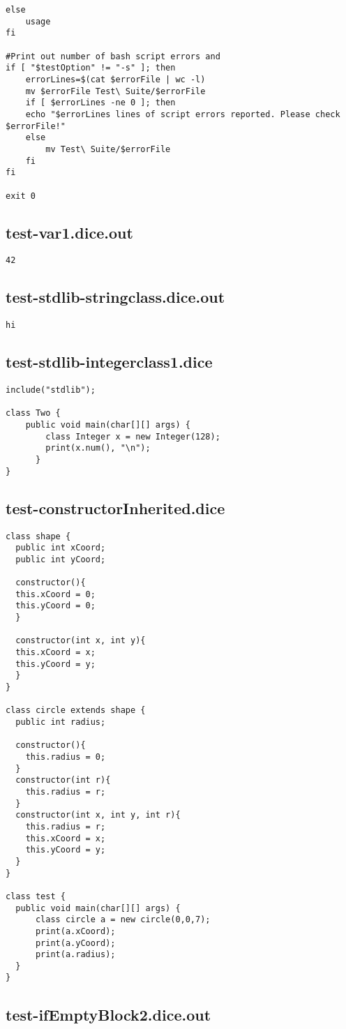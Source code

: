 \begin{verbatim}
else
	usage 
fi

#Print out number of bash script errors and 
if [ "$testOption" != "-s" ]; then
	errorLines=$(cat $errorFile | wc -l)
	mv $errorFile Test\ Suite/$errorFile
	if [ $errorLines -ne 0 ]; then
	echo "$errorLines lines of script errors reported. Please check $errorFile!"
	else
		mv Test\ Suite/$errorFile
	fi
fi

exit 0
\end{verbatim}\pagebreak\subsection{test-var1.dice.out}
\begin{verbatim}
42
\end{verbatim}\pagebreak\subsection{test-stdlib-stringclass.dice.out}
\begin{verbatim}
hi
\end{verbatim}\pagebreak\subsection{test-stdlib-integerclass1.dice}
\begin{verbatim}
include("stdlib");

class Two {
	public void main(char[][] args) {
        class Integer x = new Integer(128);
        print(x.num(), "\n");
      }
}

\end{verbatim}\pagebreak\subsection{test-constructorInherited.dice}
\begin{verbatim}
class shape {
  public int xCoord;
  public int yCoord;

  constructor(){
  this.xCoord = 0;
  this.yCoord = 0;
  }

  constructor(int x, int y){
  this.xCoord = x;
  this.yCoord = y;
  }
}

class circle extends shape {
  public int radius;

  constructor(){
  	this.radius = 0;
  }
  constructor(int r){
  	this.radius = r;
  }
  constructor(int x, int y, int r){
  	this.radius = r;
  	this.xCoord = x;
  	this.yCoord = y;
  }
}

class test {
  public void main(char[][] args) {
      class circle a = new circle(0,0,7); 
      print(a.xCoord);
      print(a.yCoord);
      print(a.radius);
  }
}
\end{verbatim}\pagebreak\subsection{test-ifEmptyBlock2.dice.out}
